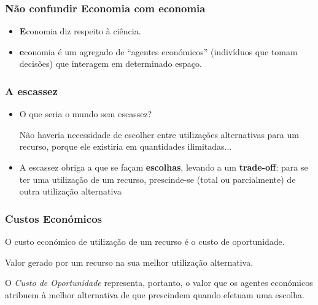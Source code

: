 \begin{frame}
	\frametitle{N\~ao confundir \textbf{E}conomia com \textbf{e}conomia}

	\begin{itemize}
		\item {\color{blue}\textbf{E}conomia} diz respeito \`a ci\^encia.
		\item {\color{blue}\textbf{e}conomia} \'e um agregado de ``agentes econ\'omicos'' (indiv\'iduos que tomam decis\~oes) que interagem em determinado espa\c co.
	\end{itemize}

\end{frame}

\begin{frame}
	\frametitle{A escassez}

	\begin{itemize}

		\item O que seria o mundo sem escassez?\pause
		
		\vspace{0.2cm}

		N\~ao haveria necessidade de escolher entre utiliza\c c\~oes alternativas para um recurso, porque ele existiria em quantidades ilimitadas... \pause

		\item A escassez obriga a que se fa\c cam \textbf{escolhas}, levando a um \textbf{trade-off}: para se ter uma utiliza\c c\~ao de um recurso, prescinde-se (total ou parcialmente) de outra utiliza\c c\~ao alternativa

	\end{itemize}

\end{frame}

\begin{frame}
	\frametitle{Custos Econ\'omicos}

	O custo econ\'omico de utiliza\c c\~ao de um recurso \'e o custo de oportunidade.\pause
	
	\begin{tcolorbox}[colback=red!5,colframe=red!40!black,title = Custo de Oportunidade]
		Valor gerado por um recurso na sua melhor utiliza\c c\~ao alternativa.
	\end{tcolorbox}\pause

	O \emph{Custo de Oportunidade} representa, portanto, o valor que os agentes econ\'omicos atribuem \`a melhor alternativa de que prescindem quando efetuam uma escolha.

\end{frame}

